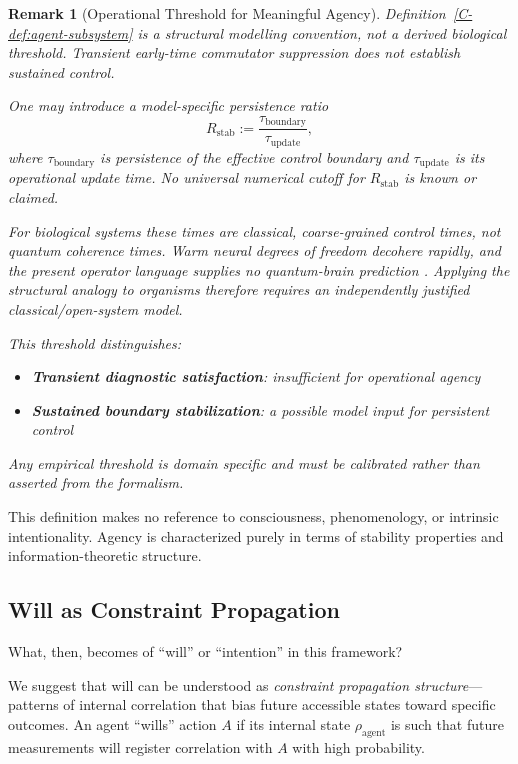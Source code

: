 \documentclass[12pt,a4paper,openany]{book}
\newtheorem{remark}[theorem]{Remark}
\begin{document}
\begin{remark}[Operational Threshold for Meaningful Agency]
\label{C-rem:agency-threshold}
Definition~\ref{C-def:agent-subsystem} is a structural modelling convention, not a derived biological threshold.  Transient early-time commutator suppression does not establish sustained control.

One may introduce a model-specific persistence ratio
\begin{equation}
R_{\mathrm{stab}}:=\frac{\tau_{\mathrm{boundary}}}{\tau_{\mathrm{update}}},
\end{equation}
where $\tau_{\mathrm{boundary}}$ is persistence of the effective control boundary and $\tau_{\mathrm{update}}$ is its operational update time.  No universal numerical cutoff for $R_{\mathrm{stab}}$ is known or claimed.

For biological systems these times are classical, coarse-grained control times, not quantum coherence times.  Warm neural degrees of freedom decohere rapidly, and the present operator language supplies no quantum-brain prediction \cite{Tegmark2000}.  Applying the structural analogy to organisms therefore requires an independently justified classical/open-system model.

This threshold distinguishes:
\begin{itemize}
\item \textbf{Transient diagnostic satisfaction}: insufficient for operational agency
\item \textbf{Sustained boundary stabilization}: a possible model input for persistent control
\end{itemize}

Any empirical threshold is domain specific and must be calibrated rather than asserted from the formalism.
\end{remark}

This definition makes no reference to consciousness, phenomenology, or intrinsic intentionality. Agency is characterized purely in terms of stability properties and information-theoretic structure.

\subsection{Will as Constraint Propagation}
\label{C-sec:II.3}

What, then, becomes of ``will'' or ``intention'' in this framework?

We suggest that will can be understood as \emph{constraint propagation structure}—patterns of internal correlation that bias future accessible states toward specific outcomes. An agent ``wills'' action $A$ if its internal state $\rho_{\text{agent}}$ is such that future measurements will register correlation with $A$ with high probability.
\end{document}

